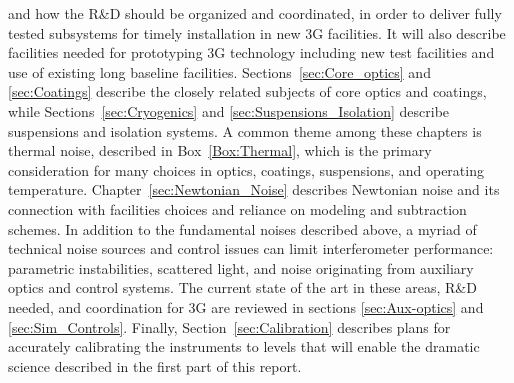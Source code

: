 and how the R\&D should be organized and coordinated, in order to deliver fully tested subsystems for timely installation in new 3G facilities. It will also describe facilities needed for prototyping 3G technology including new test facilities and use of existing long baseline facilities. Sections~\ref{sec:Core_optics} and \ref{sec:Coatings} describe the closely related subjects of core optics and coatings, while Sections~\ref{sec:Cryogenics} and \ref{sec:Suspensions_Isolation} describe suspensions and isolation systems. A common theme among these chapters is thermal noise, described in Box~\ref{Box:Thermal}, which is the primary consideration for many choices in optics, coatings, suspensions, and operating temperature. Chapter~\ref{sec:Newtonian_Noise} describes Newtonian noise and its connection with facilities choices and reliance on modeling and subtraction schemes. In addition to the fundamental noises described above, a myriad of technical noise sources and control issues can limit interferometer performance: parametric instabilities, scattered light, and noise originating from auxiliary optics and control systems. The current state of the art in these areas, R\&D needed, and coordination for 3G are reviewed in sections \ref{sec:Aux-optics} and \ref{sec:Sim_Controls}. Finally, Section~\ref{sec:Calibration} describes plans for accurately calibrating the instruments to levels that will enable the dramatic science described in the first part of this report. 

